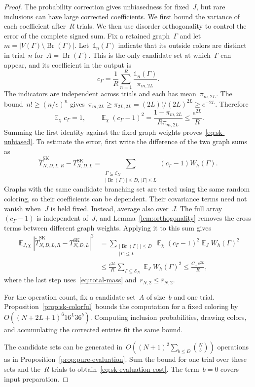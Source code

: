 \documentclass[letterpaper,11pt,reqno]{amsart}
\renewcommand{\leq}{\leqslant}
\renewcommand{\geq}{\geqslant}
\newcommand{\ind}{\mathds{1}}
\DeclareMathOperator{\E}{\mathds{E}}
\DeclareMathOperator{\Br}{Br}
\begin{document}
\begin{proof}
The probability correction gives unbiasedness for fixed~$J$, but rare inclusions can have large corrected coefficients. We first bound the variance of each coefficient after~$R$ trials. We then use disorder orthogonality to control the error of the complete signed sum.
Fix a retained graph~$\Gamma$ and let~$m=|V(\Gamma)\setminus\Br(\Gamma)|$. Let~$\ind_n(\Gamma)$ indicate that its outside colors are distinct in trial~$n$ for~$A=\Br(\Gamma)$. This is the only candidate set at which~$\Gamma$ can appear, and its coefficient in the output is
\begin{equation*}
c_\Gamma=\frac1R\sum_{n=1}^R\frac{\ind_n(\Gamma)}{\pi_{m,2L}}.
\end{equation*}
The indicators are independent across trials and each has mean~$\pi_{m,2L}$. The bound~$n!\geq(n/e)^n$ gives~$\pi_{m,2L}\geq\pi_{2L,2L}=(2L)!/(2L)^{2L}\geq e^{-2L}$. Therefore
\begin{equation}\label{eq:sk-coefficient-variance}
\E_\chi c_\Gamma=1,\qquad
\E_\chi(c_\Gamma-1)^2=\frac{1-\pi_{m,2L}}{R\pi_{m,2L}}\leq\frac{e^{2L}}{R}.
\end{equation}
Summing the first identity against the fixed graph weights proves~\eqref{eq:sk-unbiased}. To estimate the error, first write the difference of the two graph sums as
\begin{equation*}
\widetilde T^{\mathrm{SK}}_{N,D,L,R}-T^{\mathrm{SK}}_{N,D,L}
=\sum_{\substack{\Gamma\subseteq\mathcal E_N\\|\Br(\Gamma)|\leq D,\ |\Gamma|\leq L}}
(c_\Gamma-1)W_h(\Gamma).
\end{equation*}
Graphs with the same candidate branching set are tested using the same random coloring, so their coefficients can be dependent. Their covariance terms need not vanish when~$J$ is held fixed. Instead, average also over~$J$. The full array~$(c_\Gamma-1)$ is independent of~$J$, and Lemma~\ref{lem:orthogonality} removes the cross terms between different graph weights. Applying it to this sum gives
\begin{align*}
\E_{J,\chi}|\widetilde T^{\mathrm{SK}}_{N,D,L,R}-T^{\mathrm{SK}}_{N,D,L}|^2
&=\sum_{\substack{|\Br(\Gamma)|\leq D\\|\Gamma|\leq L}}
\E_\chi(c_\Gamma-1)^2\E_J W_h(\Gamma)^2\\
&\leq\frac{e^{2L}}R\sum_{\Gamma\subseteq\mathcal E_N}\E_J W_h(\Gamma)^2
\leq\frac{C_+e^{2L}}R,
\end{align*}
where the last step uses~\eqref{eq:total-mass} and~$r_{N,2}\leq\bar r_{N,2}$.

For the operation count, fix a candidate set~$A$ of size~$b$ and one trial. Proposition~\ref{prop:sk-colorful} bounds the computation for a fixed coloring by~$O((N+2L+1)^6 16^L36^b)$. Computing inclusion probabilities, drawing colors, and accumulating the corrected entries fit the same bound.

The candidate sets can be generated in~$O((N+1)^2\sum_{b\leq D}\binom Nb)$ operations as in Proposition~\ref{prop:pure-evaluation}. Sum the bound for one trial over these sets and the~$R$ trials to obtain~\eqref{eq:sk-evaluation-cost}. The term~$b=0$ covers input preparation.
\end{proof}
\end{document}
